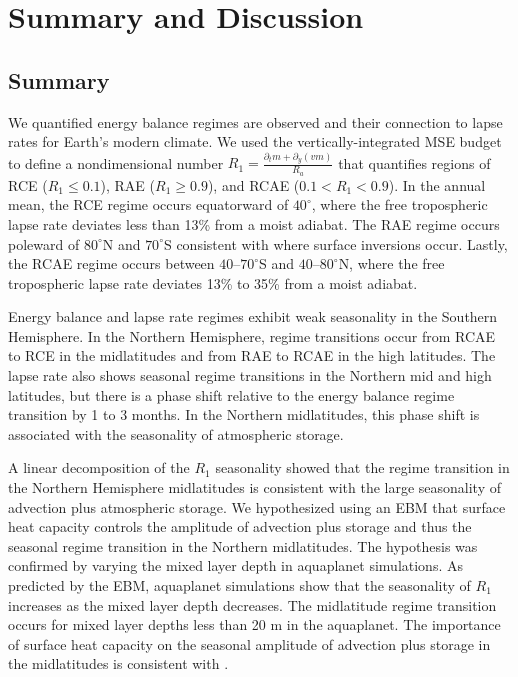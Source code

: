 \documentclass{ametsocV5}
\begin{document}
\section{Summary and Discussion}\label{sec:conclusion}
\subsection{Summary}
We quantified  energy balance regimes are observed and their connection to lapse rates for Earth's modern climate. We used the vertically-integrated MSE budget to define a nondimensional number $R_1=\frac{\partial_t m + \partial_y (vm)}{R_a}$ that quantifies regions of RCE ($R_1\le0.1$), RAE ($R_1\ge0.9$), and RCAE ($0.1<R_1<0.9$). In the annual mean, the RCE regime occurs equatorward of $40^\circ$, where the free tropospheric lapse rate deviates less than 13\% from a moist adiabat. The RAE regime occurs poleward of $80^\circ$N and $70^\circ$S consistent with where surface inversions occur. Lastly, the RCAE regime occurs between $40$--$70^\circ$S and $40$--$80^\circ$N, where the free tropospheric lapse rate deviates 13\% to 35\% from a moist adiabat.

Energy balance and lapse rate regimes exhibit weak seasonality in the Southern Hemisphere. In the Northern Hemisphere, regime transitions occur from RCAE to RCE in the midlatitudes and from RAE to RCAE in the high latitudes. The lapse rate also shows seasonal regime transitions in the Northern mid and high latitudes, but there is a phase shift relative to the energy balance regime transition by 1 to 3 months. In the Northern midlatitudes, this phase shift is associated with the seasonality of atmospheric storage.

A linear decomposition of the $R_1$ seasonality showed that the regime transition in the Northern Hemisphere midlatitudes is consistent with the large seasonality of advection plus atmospheric storage. We hypothesized using an EBM that surface heat capacity controls the amplitude of advection plus storage and thus the seasonal regime transition in the Northern midlatitudes. The hypothesis was confirmed by varying the mixed layer depth in aquaplanet simulations. As predicted by the EBM, aquaplanet simulations show that the seasonality of $R_1$ increases as the mixed layer depth decreases. The midlatitude regime transition occurs for mixed layer depths less than 20 m in the aquaplanet. The importance of surface heat capacity on the seasonal amplitude of advection plus storage in the midlatitudes is consistent with \cite{barpanda2020}.
\end{document}
